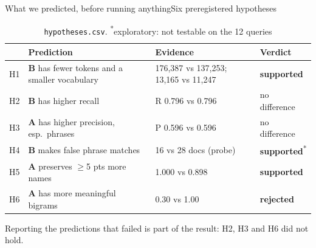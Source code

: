 \documentclass[
  aspectratio=169,
  10pt,
  t,
]{beamer}
\newcommand{\A}{\textcolor{pipeA}{\textbf{A}}}
\newcommand{\B}{\textcolor{pipeB}{\textbf{B}}}
\newcommand{\muted}[1]{\textcolor{muted}{#1}}
\begin{document}
\begin{frame}{What we predicted, before running anything}{Six preregistered hypotheses}
\begin{table}
\footnotesize
\begin{tabular}{llll}
\toprule
& Prediction & Evidence & Verdict \\
\midrule
H1 & \B{} has fewer tokens and a smaller vocabulary & 176,387 vs 137,253; 13,165 vs 11,247 & \textcolor{good}{\textbf{supported}} \\
H2 & \B{} has higher recall & R 0.796 vs 0.796 & no difference \\
H3 & \A{} has higher precision, esp.\ phrases & P 0.596 vs 0.596 & no difference \\
H4 & \B{} makes false phrase matches & 16 vs 28 docs (probe) & \textcolor{good}{\textbf{supported}}\textsuperscript{*} \\
H5 & \A{} preserves $\geq$5 pts more names & 1.000 vs 0.898 & \textcolor{good}{\textbf{supported}} \\
H6 & \A{} has more meaningful bigrams & 0.30 vs 1.00 & \textcolor{pipeA}{\textbf{rejected}} \\
\bottomrule
\end{tabular}
\caption{\texttt{hypotheses.csv}. \textsuperscript{*}exploratory: not testable on the 12 queries}
\end{table}
\muted{\small Reporting the predictions that failed is part of the result: H2, H3 and H6 did not hold.}
\end{frame}
\end{document}
